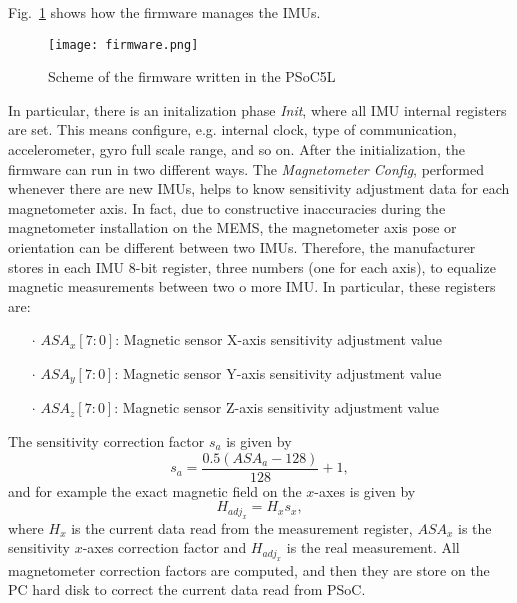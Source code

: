 Fig.~\ref{fig:psocfirmware} shows how the firmware manages the IMUs. %
\begin{figure}[h]
\centering
\texttt{[image: firmware.png]}
\caption{Scheme of the firmware written in the PSoC5L}
\label{fig:psocfirmware}
\end{figure}
In particular, there is an initalization phase \textit{Init}, where all IMU internal registers are set. This means configure, e.g. internal clock, type of communication, accelerometer, gyro full scale range, and so on.
After the initialization, the firmware can run in two different ways. The \textit{Magnetometer Config}, performed whenever there are new IMUs, helps to know sensitivity adjustment data for each magnetometer axis. In fact, due to constructive inaccuracies during the magnetometer installation on the MEMS, the magnetometer axis pose or orientation can be different between two IMUs. Therefore, the manufacturer stores in each IMU 8-bit register, three numbers (one for each axis), to equalize magnetic measurements between two o more IMU. In particular, these registers are:

\begin{enumerate}
\item[$\cdot$] $ASA_x[7:0]$: Magnetic sensor X-axis sensitivity adjustment value
\item[$\cdot$] $ASA_y[7:0]$: Magnetic sensor Y-axis sensitivity adjustment value
\item[$\cdot$] $ASA_z[7:0]$: Magnetic sensor Z-axis sensitivity adjustment value
\end{enumerate}

The sensitivity correction factor $s_a$ is given by %
\begin{equation}
s_a  = \frac{ 0.5(ASA_a - 128)}{128} + 1,
\end{equation}
and for example the exact magnetic field on the $x$-axes is given by
\begin{equation}
H_{{adj}_x} = H_x s_x,
\end{equation}
where $H_x$ is the current data read from the measurement register, $ASA_x$ is the sensitivity $x$-axes correction factor and $H_{{adj}_x}$ is the real measurement.
All magnetometer correction factors are computed, and then they are store on the PC hard disk to correct the current data read from PSoC. %

